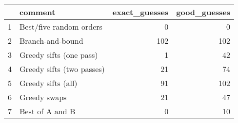 \begin{table}[ht]
\centering
\begin{tabular}{rlrr}
  \hline
 & comment & exact\_guesses & good\_guesses \\ 
  \hline
1 & Best/five random orders &   0 &   0 \\ 
  2 & Branch-and-bound & 102 & 102 \\ 
  3 & Greedy sifts (one pass) &   1 &  42 \\ 
  4 & Greedy sifts (two passes) &  21 &  74 \\ 
  5 & Greedy sifts (all) &  91 & 102 \\ 
  6 & Greedy swaps &  21 &  47 \\ 
  7 & Best of A and B &   0 &  10 \\ 
   \hline
\end{tabular}
\end{table}
